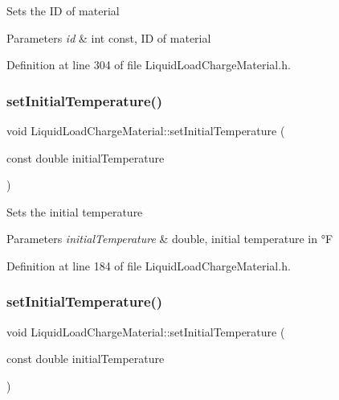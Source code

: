 Sets the ID of material 
\begin{DoxyParams}{Parameters}
{\em id} & int const, ID of material \\
\hline
\end{DoxyParams}


Definition at line 304 of file Liquid\+Load\+Charge\+Material.\+h.

\mbox{\label{class_liquid_load_charge_material_ac30600ef82db69934e8c08e4a774bb03}} 
\subsubsection{\texorpdfstring{set\+Initial\+Temperature()}{setInitialTemperature()}\hspace{0.1cm}{\footnotesize\ttfamily [1/3]}}
{\footnotesize\ttfamily void Liquid\+Load\+Charge\+Material\+::set\+Initial\+Temperature (\begin{DoxyParamCaption}\item[{const double}]{initial\+Temperature }\end{DoxyParamCaption})\hspace{0.3cm}{\ttfamily [inline]}}

Sets the initial temperature 
\begin{DoxyParams}{Parameters}
{\em initial\+Temperature} & double, initial temperature in °F \\
\hline
\end{DoxyParams}


Definition at line 184 of file Liquid\+Load\+Charge\+Material.\+h.

\mbox{\label{class_liquid_load_charge_material_ac30600ef82db69934e8c08e4a774bb03}} 
\subsubsection{\texorpdfstring{set\+Initial\+Temperature()}{setInitialTemperature()}\hspace{0.1cm}{\footnotesize\ttfamily [2/3]}}
{\footnotesize\ttfamily void Liquid\+Load\+Charge\+Material\+::set\+Initial\+Temperature (\begin{DoxyParamCaption}\item[{const double}]{initial\+Temperature }\end{DoxyParamCaption})\hspace{0.3cm}{\ttfamily [inline]}}

